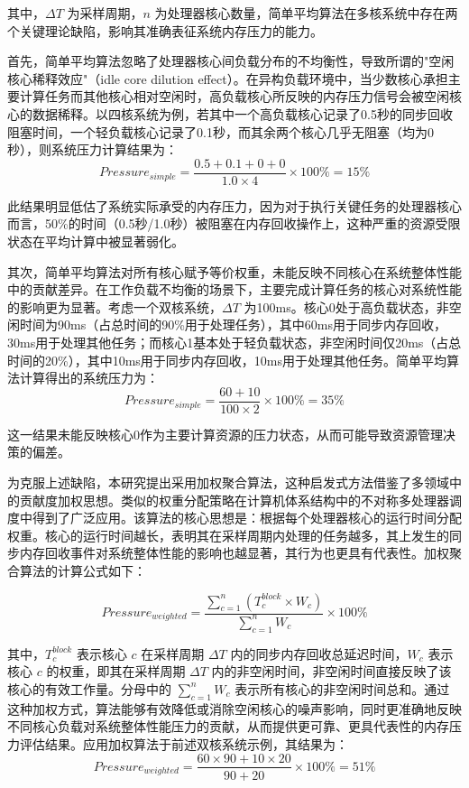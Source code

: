 其中，\(\Delta T\) 为采样周期，\(n\) 为处理器核心数量，简单平均算法在多核系统中存在两个关键理论缺陷，影响其准确表征系统内存压力的能力。

首先，简单平均算法忽略了处理器核心间负载分布的不均衡性，导致所谓的"空闲核心稀释效应"（idle core dilution effect）。在异构负载环境中，当少数核心承担主要计算任务而其他核心相对空闲时，高负载核心所反映的内存压力信号会被空闲核心的数据稀释。以四核系统为例，若其中一个高负载核心记录了0.5秒的同步回收阻塞时间，一个轻负载核心记录了0.1秒，而其余两个核心几乎无阻塞（均为0秒），则系统压力计算结果为：
\[
Pressure_{simple} = \frac{0.5 + 0.1 + 0 + 0}{1.0 \times 4} \times 100\% = 15\%
\]

此结果明显低估了系统实际承受的内存压力，因为对于执行关键任务的处理器核心而言，50\%的时间（0.5秒/1.0秒）被阻塞在内存回收操作上，这种严重的资源受限状态在平均计算中被显著弱化。

其次，简单平均算法对所有核心赋予等价权重，未能反映不同核心在系统整体性能中的贡献差异。在工作负载不均衡的场景下，主要完成计算任务的核心对系统性能的影响更为显著。考虑一个双核系统，\(\Delta T\) 为100ms。核心0处于高负载状态，非空闲时间为90ms（占总时间的90\%用于处理任务），其中60ms用于同步内存回收，30ms用于处理其他任务；而核心1基本处于轻负载状态，非空闲时间仅20ms（占总时间的20\%），其中10ms用于同步内存回收，10ms用于处理其他任务。简单平均算法计算得出的系统压力为：
\[
Pressure_{simple} = \frac{60 + 10}{100 \times 2} \times 100\% = 35\%
\]

这一结果未能反映核心0作为主要计算资源的压力状态，从而可能导致资源管理决策的偏差。

为克服上述缺陷，本研究提出采用加权聚合算法，这种启发式方法借鉴了多领域中的贡献度加权思想。类似的权重分配策略在计算机体系结构中的不对称多处理器调度中得到了广泛应用。该算法的核心思想是：根据每个处理器核心的运行时间分配权重。核心的运行时间越长，表明其在采样周期内处理的任务越多，其上发生的同步内存回收事件对系统整体性能的影响也越显著，其行为也更具有代表性。加权聚合算法的计算公式如下：

\begin{equation}
    \label{eq:weighted_aggregation}
    Pressure_{weighted} = \frac{\sum_{c=1}^{n} (T_c^{block} \times W_c)}{\sum_{c=1}^{n} W_c} \times 100\%
\end{equation}

其中，\(T_c^{block}\) 表示核心 \(c\) 在采样周期 \(\Delta T\) 内的同步内存回收总延迟时间，\(W_c\) 表示核心 \(c\) 的权重，即其在采样周期 \(\Delta T\) 内的非空闲时间，非空闲时间直接反映了该核心的有效工作量。分母中的 \(\sum_{c=1}^{n} W_c\) 表示所有核心的非空闲时间总和。通过这种加权方式，算法能够有效降低或消除空闲核心的噪声影响，同时更准确地反映不同核心负载对系统整体性能压力的贡献，从而提供更可靠、更具代表性的内存压力评估结果。应用加权算法于前述双核系统示例，其结果为：
\[
Pressure_{weighted} = \frac{60 \times 90 + 10 \times 20}{90 + 20} \times 100\% = 51\%
\]

